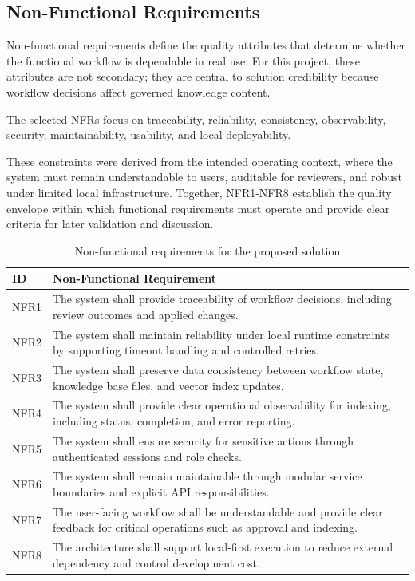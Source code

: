 \subsection{Non-Functional Requirements}

Non-functional requirements define the quality attributes that determine whether the functional workflow is dependable in real use.
For this project, these attributes are not secondary; they are central to solution credibility because workflow decisions affect governed knowledge content.

\vspace{0.4cm}

The selected NFRs focus on traceability, reliability, consistency, observability, security, maintainability, usability, and local deployability.

These constraints were derived from the intended operating context, where the system must remain understandable to users, auditable for reviewers, and robust under limited local infrastructure.
Together, NFR1-NFR8 establish the quality envelope within which functional requirements must operate and provide clear criteria for later validation and discussion.

\begin{table}[H]
\centering
\small
\begin{tabular}{p{2.2cm} p{12.5cm}}
\textbf{ID} & \textbf{Non-Functional Requirement} \\
\hline

NFR1 & The system shall provide traceability of workflow decisions, including review outcomes and applied changes. \\
\hline
NFR2 & The system shall maintain reliability under local runtime constraints by supporting timeout handling and controlled retries. \\
\hline
NFR3 & The system shall preserve data consistency between workflow state, knowledge base files, and vector index updates. \\
\hline
NFR4 & The system shall provide clear operational observability for indexing, including status, completion, and error reporting. \\
\hline
NFR5 & The system shall ensure security for sensitive actions through authenticated sessions and role checks. \\
\hline
NFR6 & The system shall remain maintainable through modular service boundaries and explicit API responsibilities. \\
\hline
NFR7 & The user-facing workflow shall be understandable and provide clear feedback for critical operations such as approval and indexing. \\
\hline
NFR8 & The architecture shall support local-first execution to reduce external dependency and control development cost. \\

\hline
\end{tabular}
\caption{Non-functional requirements for the proposed solution}
\label{tab:nonfunctional_requirements}
\end{table}





